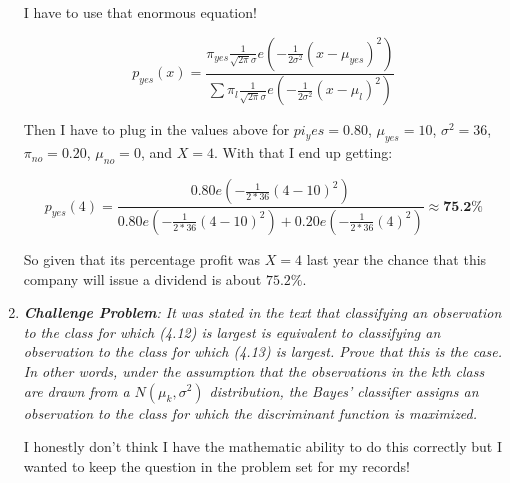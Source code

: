 \documentclass[11pt]{article}
\begin{document}
\begin{enumerate}
I have to use that enormous equation!

$$ p_{yes}(x) = \frac {\pi_{yes}
                \frac {1} {\sqrt{2 \pi} \sigma}
                e(- \frac {1} {2 \sigma^2} (x - \mu_{yes})^2)
               }
               {\sum {
                \pi_l
                \frac {1} {\sqrt{2 \pi} \sigma}
                e(- \frac {1} {2 \sigma^2} (x - \mu_l)^2)
               }}
$$

Then I have to plug in the values above for $pi_yes = 0.80$, $\mu_{yes} = 10$, $\sigma^2 = 36$, $\pi_{no} = 0.20$, $\mu_{no} = 0$, and $X = 4$. With that I end up getting:

$$ p_{yes}(4)  = \frac {0.80 e(- \frac {1} {2 * 36}  (4 - 10)^2)} {
                0.80 e(- \frac {1} {2 * 36} (4 - 10)^2) +
                0.20 e(- \frac {1} {2 * 36}  (4)^2) } \approx \textbf{75.2\%} $$

So given that its percentage profit was $X = 4$ last year the chance that this company will issue a dividend is about $75.2\%$.

\setcounter{enumi}{1}
    \item \textit{\textbf{Challenge Problem}: It was stated in the text that classifying an observation to the class for which (4.12) is largest is equivalent to classifying an observation to the class for which (4.13) is largest. Prove that this is the case. In other words, under the assumption that the observations in the $k$th class are drawn from a $N(\mu_k,\sigma^2)$ distribution, the Bayes’ classifier assigns an observation to the class for which the discriminant function is maximized.}

I honestly don't think I have the mathematic ability to do this correctly but I wanted to keep the question in the problem set for my records!

\end{enumerate}
\end{document}
